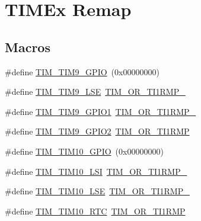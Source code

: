 \hypertarget{group___t_i_m_ex___remap}{\section{T\-I\-M\-Ex Remap}
\label{group___t_i_m_ex___remap}
}
\subsection*{Macros}
\begin{DoxyCompactItemize}
\item 
\#define \hyperlink{group___t_i_m_ex___remap_ga05cfad41533bf2756c340605363ed19f}{T\-I\-M\-\_\-\-T\-I\-M9\-\_\-\-G\-P\-I\-O}~(0x00000000)
\item 
\#define \hyperlink{group___t_i_m_ex___remap_gac823cb02bf4f849764a4560358663908}{T\-I\-M\-\_\-\-T\-I\-M9\-\_\-\-L\-S\-E}~\hyperlink{group___peripheral___registers___bits___definition_ga2f9ba136b3dca26c39de5da6eca8fbc1}{T\-I\-M\-\_\-\-O\-R\-\_\-\-T\-I1\-R\-M\-P\-\_}
\item 
\#define \hyperlink{group___t_i_m_ex___remap_ga9be309e524529ea9f561bc86c98d057b}{T\-I\-M\-\_\-\-T\-I\-M9\-\_\-\-G\-P\-I\-O1}~\hyperlink{group___peripheral___registers___bits___definition_gaf91cb3077c1904d1e039c99725297bdb}{T\-I\-M\-\_\-\-O\-R\-\_\-\-T\-I1\-R\-M\-P\-\_}
\item 
\#define \hyperlink{group___t_i_m_ex___remap_gaa032a75b028bb983d7a023c8b3565fd5}{T\-I\-M\-\_\-\-T\-I\-M9\-\_\-\-G\-P\-I\-O2}~\hyperlink{group___peripheral___registers___bits___definition_gab06e0dfcaeb7a7be254b71b1d4c3fd44}{T\-I\-M\-\_\-\-O\-R\-\_\-\-T\-I1\-R\-M\-P}
\item 
\#define \hyperlink{group___t_i_m_ex___remap_gaf7c4ce1f0999db337ec1706ed8a4c1c1}{T\-I\-M\-\_\-\-T\-I\-M10\-\_\-\-G\-P\-I\-O}~(0x00000000)
\item 
\#define \hyperlink{group___t_i_m_ex___remap_ga3232168ebecf2973088dfee75ceffe62}{T\-I\-M\-\_\-\-T\-I\-M10\-\_\-\-L\-S\-I}~\hyperlink{group___peripheral___registers___bits___definition_ga2f9ba136b3dca26c39de5da6eca8fbc1}{T\-I\-M\-\_\-\-O\-R\-\_\-\-T\-I1\-R\-M\-P\-\_}
\item 
\#define \hyperlink{group___t_i_m_ex___remap_ga149ca8942b96738acba1740aebb52914}{T\-I\-M\-\_\-\-T\-I\-M10\-\_\-\-L\-S\-E}~\hyperlink{group___peripheral___registers___bits___definition_gaf91cb3077c1904d1e039c99725297bdb}{T\-I\-M\-\_\-\-O\-R\-\_\-\-T\-I1\-R\-M\-P\-\_}
\item 
\#define \hyperlink{group___t_i_m_ex___remap_ga286067059eb38127d949d72ba359a049}{T\-I\-M\-\_\-\-T\-I\-M10\-\_\-\-R\-T\-C}~\hyperlink{group___peripheral___registers___bits___definition_gab06e0dfcaeb7a7be254b71b1d4c3fd44}{T\-I\-M\-\_\-\-O\-R\-\_\-\-T\-I1\-R\-M\-P}

\end{DoxyCompactItemize}

